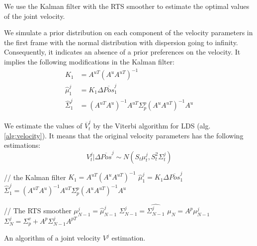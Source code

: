 We use the Kalman filter with the RTS smoother \cite{rauch1965maximum} to estimate the optimal values of the joint velocity.

We simulate a prior distribution on each component of the velocity parameters in the first frame with the normal distribution with dispersion going to infinity. Consequently, it indicates an absence of a prior preferences on the velocity. It implies the following modifications in the Kalman filter:
\begin{equation*}
	\begin{aligned}
		K_1 &= A^{uT} \left(A^u A^{uT}\right)^{-1} \\
		\hat{\mu}_1^j &= K_1 \Delta \overline{Pos}_1^j \\
		\hat{\Sigma}_1^j &= 
		\left(A^{uT} A^u\right)^{-1} A^{uT} \Sigma_p^p \left(A^u A^{uT}\right)^{-1} A^u
	\end{aligned}
\end{equation*}

We estimate the values of $\overline{V}_t^j$ by the Viterbi algorithm \cite{viterbi1967error} for LDS (alg. \ref{alg:velocity}). It means that the original velocity parameters has the following estimations:
\[
V_t^j|\Delta\overline{Pos}^j \sim N\left(S_t\mu_t^j, S_t^2 \Sigma_t^j \right)
\]

\begin{algorithm}[!t]
	
	// the Kalman filter\;
	$K_1 = A^{uT} \left(A^u A^{uT}\right)^{-1}$\;
	$\hat{\mu}_1^j = K_1 \Delta \overline{Pos}_1^j $\;
	$\hat{\Sigma}_1^j =
	\left(A^{uT} A^u\right)^{-1} A^{uT} \Sigma_p^p \left(A^u A^{uT}\right)^{-1} A^u$ \;
	
	// The RTS smoother\;
	$\mu_{N-1}^j = \hat{\mu}_{N-1}^j$\;
	$\Sigma_{N-1}^j = \hat{\Sigma_{N-1}^j}$\;
	$\mu_N = A^p \mu_{N-1}^j$\;
	$\Sigma_N^j = \Sigma_p^v + A^p \Sigma_{N-1}^j A^{pT}$\;
	\caption{An algorithm of a joint velocity $V^j$ estimation.} \label{alg:velocity}
\end{algorithm}

